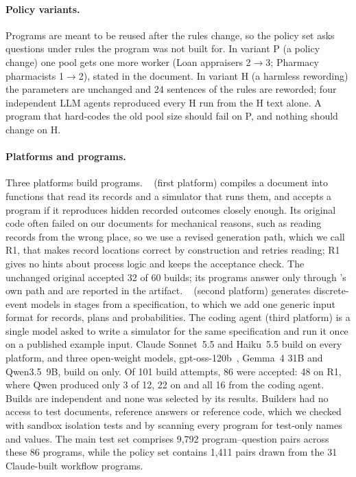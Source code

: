 \paragraph{Policy variants.} Programs are meant to be reused after the rules change, so the policy set asks questions under rules the program was not built for. In variant P (a policy change) one pool gets one more worker (Loan appraisers 2$\to$3; Pharmacy pharmacists 1$\to$2), stated in the document. In variant H (a harmless rewording) the parameters are unchanged and 24 sentences of the rules are reworded; four independent LLM agents reproduced every H run from the H text alone. A program that hard-codes the old pool size should fail on P, and nothing should change on H.

\paragraph{Platforms and programs.} Three platforms build programs. \otf~\cite{otftools2026} (first platform) compiles a document into functions that read its records and a simulator that runs them, and accepts a program if it reproduces hidden recorded outcomes closely enough. Its original code often failed on our documents for mechanical reasons, such as reading records from the wrong place, so we use a revised generation path, which we call R1, that makes record locations correct by construction and retries reading; R1 gives no hints about process logic and keeps the acceptance check. The unchanged original \otf accepted 32 of 60 builds; its programs answer only through \otf's own path and are reported in the artifact. \devs~\cite{chen2026devs} (second platform) generates discrete-event models in stages from a specification, to which we add one generic input format for records, plans and probabilities. The coding agent (third platform) is a single model asked to write a simulator for the same specification and run it once on a published example input. Claude Sonnet~5.5 and Haiku~5.5 build on every platform, and three open-weight models, gpt-oss-120b~\cite{openai2025gptoss}, Gemma~4 31B and Qwen3.5~9B, build on \otf only. Of 101 build attempts, 86 were accepted: 48 on \otf R1, where Qwen produced only 3 of 12, 22 on \devs and all 16 from the coding agent. Builds are independent and none was selected by its results. Builders had no access to test documents, reference answers or reference code, which we checked with sandbox isolation tests and by scanning every program for test-only names and values. The main test set comprises 9{,}792 program--question pairs across these 86 programs, while the policy set contains 1{,}411 pairs drawn from the 31 Claude-built workflow programs.
